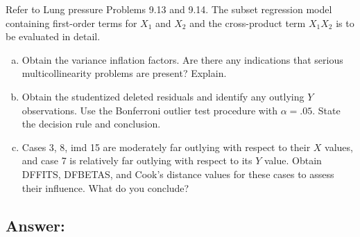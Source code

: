 \documentclass{article}
\begin{document}
Refer to Lung pressure Problems 9.13 and 9.14. The subset regression model containing first-order terms for $X_1$ and $X_2$ and the cross-product term $X_1X_2$ is to be evaluated in detail.

\begin{enumerate}[a)]
\item{} Obtain the variance inflation factors. Are there any indications that serious multicollinearity problems are present? Explain.
\item{} Obtain the studentized deleted residuals and identify any outlying $Y$ observations. Use the Bonferroni outlier test procedure with $\alpha{} = .05$. State the decision rule and conclusion.
\item{} Cases 3, 8, imd 15 are moderately far outlying with respect to their $X$ values, and case 7 is relatively far outlying with respect to its $Y$ value. Obtain DFFITS, DFBETAS, and Cook's distance values for these cases to assess their influence. What do you conclude?
\end{enumerate}

\subsection{Answer:}
\end{document}
